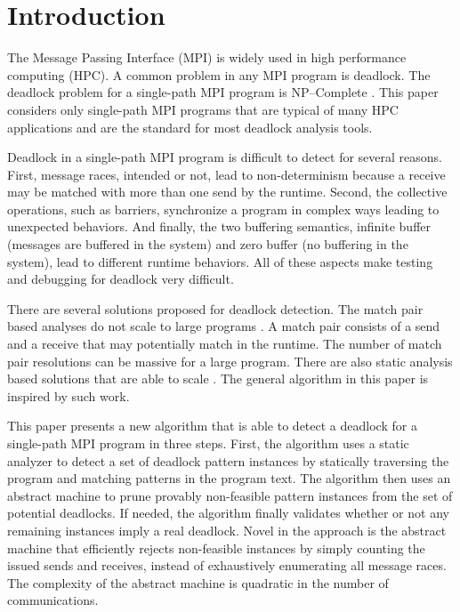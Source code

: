 \section{Introduction}

The Message Passing Interface (MPI) is widely used in high performance computing (HPC). A common problem in any MPI program is deadlock. The deadlock problem for a single-path MPI program is NP--Complete \cite{DBLP:conf/fm/ForejtKNS14}.
This paper considers only single-path MPI programs that are typical of many HPC applications and are the standard for most deadlock analysis tools.  

Deadlock in a single-path MPI program is difficult to detect for several reasons. First, message races, intended or not, lead to non-determinism because a receive may be matched with more than one send by the runtime. Second, the collective operations, such as barriers, synchronize a program in complex ways leading to unexpected behaviors. And finally, the two buffering semantics, infinite buffer (messages are buffered in the system) and zero buffer (no buffering in the system), lead to different runtime behaviors. All of these aspects make testing and debugging for deadlock very difficult. 

There are several solutions proposed for deadlock detection. The match pair based analyses do not scale to large programs \cite{DBLP:conf/ppopp/VakkalankaSGK08, DBLP:conf/sbmf/SharmaGB12, DBLP:conf/fm/ForejtKNS14}. A match pair consists of a send and a receive that may potentially match in the runtime. The number of match pair resolutions can be massive for a large program.
There are also static analysis based solutions that are able to scale \cite{DBLP:conf/sc/SharmaGB12, DBLP:conf/pldi/JoshiPSN09, Subodh:Dissertation}. The general algorithm in this paper is inspired by such work.

This paper presents a new algorithm that is able to detect a deadlock for a single-path MPI program in three steps. First, the algorithm uses a static analyzer to detect a set of deadlock pattern instances by statically traversing the program and matching patterns in the program text. The algorithm then uses an abstract machine to prune provably non-feasible pattern instances from the set of potential deadlocks. If needed, the algorithm finally validates whether or not any remaining instances imply a real deadlock. Novel in the approach is the abstract machine that efficiently rejects non-feasible instances by simply counting the issued sends and receives, instead of exhaustively enumerating all message races. The complexity of the abstract machine is quadratic in the number of communications. 

